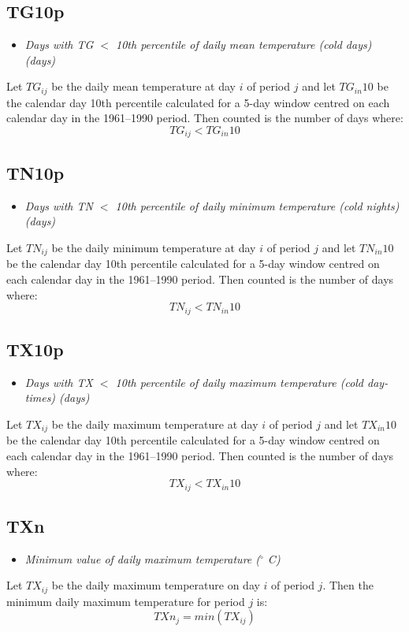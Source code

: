 \documentclass[a4paper,11pt]{article}
\begin{document}
\subsection*{TG10p}
\begin{itemize}
\item \textit{Days with TG $<$ 10th percentile of daily mean temperature
(cold days) (days)}
\end{itemize}
Let $TG_{ij}$ be the daily mean temperature at day $i$ of period $j$
and let $TG_{in}10$ be the calendar day 10th percentile calculated for
a 5-day window centred on each calendar day in the 1961--1990
period. Then counted is the number of days where:
\begin{equation*}
TG_{ij} < TG_{in}10
\end{equation*}

\subsection*{TN10p}
\begin{itemize}
\item \textit{Days with TN $<$ 10th percentile of daily minimum
temperature (cold nights) (days)}
\end{itemize}
Let $TN_{ij}$ be the daily minimum temperature at day $i$ of period
$j$ and let $TN_{in}10$ be the calendar day 10th percentile calculated
for a 5-day window centred on each calendar day in the 1961--1990
period. Then counted is the number of days where:
\begin{equation*}
TN_{ij} < TN_{in}10
\end{equation*}

\subsection*{TX10p}
\begin{itemize}
\item \textit{Days with TX $<$ 10th percentile of daily maximum
temperature (cold day-times) (days)}
\end{itemize}
Let $TX_{ij}$ be the daily maximum temperature at day $i$ of period
$j$ and let $TX_{in}10$ be the calendar day 10th percentile calculated
for a 5-day window centred on each calendar day in the 1961--1990
period. Then counted is the number of days where:
\begin{equation*}
TX_{ij} < TX_{in}10
\end{equation*}

\subsection*{TXn}
\begin{itemize}
\item \textit{Minimum value of daily maximum temperature ($^\circ$ C)}
\end{itemize}
Let $TX_{ij}$ be the daily maximum temperature on day $i$ of period
$j$. Then the minimum daily maximum temperature for period $j$ is:
\begin{equation*}
TXn_{j} = min(TX_{ij})
\end{equation*}
\end{document}
